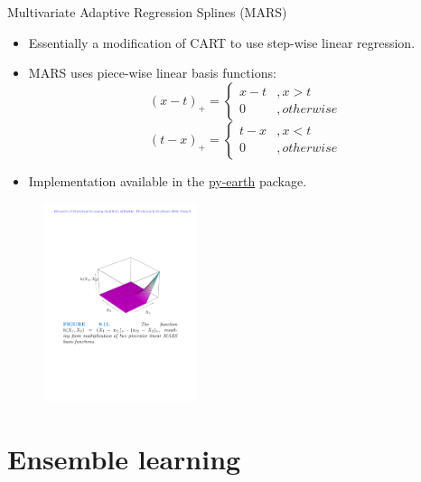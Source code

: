 \documentclass{beamer}
\begin{document}
\begin{frame}{Multivariate Adaptive Regression Splines (MARS)}
    \begin{itemize}
        \item Essentially a modification of CART to use step-wise linear regression.
        \item MARS uses piece-wise linear basis functions:
        \begin{equation*}
            (x - t)_+ = \left\{
  \begin{array}{lr}
    x - t &, x > t\\
    0 &, otherwise
  \end{array}
\right.
        \end{equation*}
        \begin{equation*}
            (t - x)_+ = \left\{
  \begin{array}{lr}
    t - x &, x < t\\
    0 &, otherwise
  \end{array}
\right.
        \end{equation*}
        \item Implementation available in the \href{https://contrib.scikit-learn.org/py-earth/index.html}{py-earth} package.
    \end{itemize}
    \begin{figure}
    \centering
    \includegraphics[width=0.4\textwidth]{figures/MARS.pdf}
\end{figure}
\end{frame}


\section{Ensemble learning}
\end{document}
